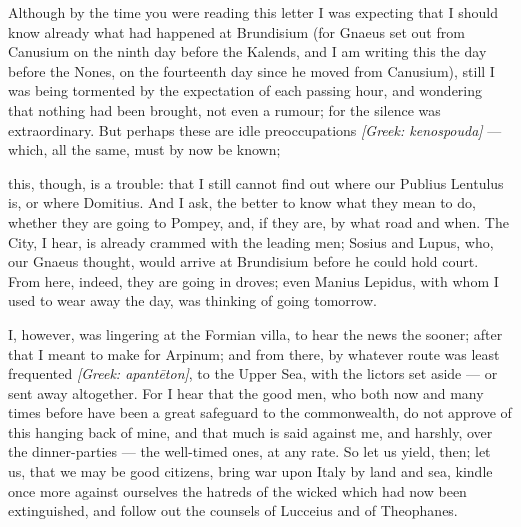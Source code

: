 

 Although by the time you were reading this letter I was expecting that I should know already what had happened at Brundisium (for Gnaeus set out from Canusium on the ninth day before the Kalends, and I am writing this the day before the Nones, on the fourteenth day since he moved from Canusium), still I was being tormented by the expectation of each passing hour, and wondering that nothing had been brought, not even a rumour; for the silence was extraordinary. But perhaps these are idle preoccupations \textit{[Greek: kenospouda]} --- which, all the same, must by now be known;

 this, though, is a trouble: that I still cannot find out where our Publius Lentulus is, or where Domitius. And I ask, the better to know what they mean to do, whether they are going to Pompey, and, if they are, by what road and when. The City, I hear, is already crammed with the leading men; Sosius and Lupus, who, our Gnaeus thought, would arrive at Brundisium before he could hold court. From here, indeed, they are going in droves; even Manius Lepidus, with whom I used to wear away the day, was thinking of going tomorrow.

 I, however, was lingering at the Formian villa, to hear the news the sooner; after that I meant to make for Arpinum; and from there, by whatever route was least frequented \textit{[Greek: apantēton]}, to the Upper Sea, with the lictors set aside --- or sent away altogether. For I hear that the good men, who both now and many times before have been a great safeguard to the commonwealth, do not approve of this hanging back of mine, and that much is said against me, and harshly, over the dinner-parties --- the well-timed ones, at any rate. So let us yield, then; let us, that we may be good citizens, bring war upon Italy by land and sea, kindle once more against ourselves the hatreds of the wicked which had now been extinguished, and follow out the counsels of Lucceius and of Theophanes.

